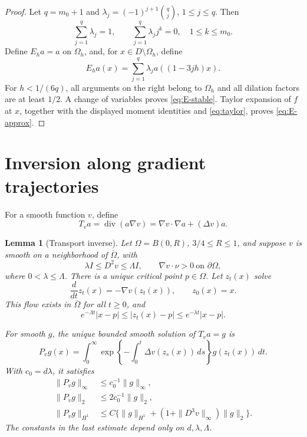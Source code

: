 \documentclass[11pt]{article}
\newtheorem{lemma}[theorem]{Lemma}
\theoremstyle{remark}
\DeclareMathOperator{\divergence}{div}
\begin{document}
\begin{proof}
Let \(q=m_0+1\) and
\(\lambda_j=(-1)^{j+1}\binom qj\), \(1\leq j\leq q\).
Then
\[
\sum_{j=1}^q\lambda_j=1,\qquad
\sum_{j=1}^q\lambda_j j^k=0,\quad 1\leq k\leq m_0.
\]
Define \(E_h a=a\) on \(\Omega_h\), and, for \(x\in D\setminus\Omega_h\),
define
\[
E_h a(x)=\sum_{j=1}^q\lambda_j a((1-3jh)x).
\]
For \(h<1/(6q)\), all arguments on the right belong to \(\Omega_h\)
and all dilation factors are at least \(1/2\).
A change of variables proves \eqref{eq:E-stable}.
Taylor expansion of \(f\) at \(x\), together with the displayed
moment identities and \eqref{eq:taylor}, proves
\eqref{eq:E-approx}.
\end{proof}

\section{Inversion along gradient trajectories}

For a smooth function \(v\), define
\[
T_v a=\divergence(a\nabla v)
=\nabla v\cdot\nabla a+(\Delta v)a.
\]

\begin{lemma}[Transport inverse]\label{lem:transport}
Let \(\Omega=B(0,R)\), \(3/4\leq R\leq1\), and suppose \(v\) is
smooth on a neighborhood of \(\overline\Omega\), with
\begin{equation}\label{eq:geometry}
\lambda I\leq D^2v\leq\Lambda I,\qquad
\nabla v\cdot\nu>0\ \text{on }\partial\Omega,
\end{equation}
where \(0<\lambda\leq\Lambda\).
There is a unique critical point \(p\in\Omega\).
Let \(z_t(x)\) solve
\[
\frac{d}{dt}z_t(x)=-\nabla v(z_t(x)),\qquad z_0(x)=x.
\]
This flow exists in \(\overline\Omega\) for all \(t\geq0\), and
\begin{equation}\label{eq:radial-flow}
e^{-\Lambda t}|x-p|
\leq |z_t(x)-p|
\leq e^{-\lambda t}|x-p|.
\end{equation}

For smooth \(g\), the unique bounded smooth solution of \(T_v a=g\)
is
\begin{equation}\label{eq:transport-inverse}
P_vg(x)=
\int_0^\infty
\exp\left\{-\int_0^t\Delta v(z_s(x))\,ds\right\}
g(z_t(x))\,dt.
\end{equation}
With \(c_0=d\lambda\), it satisfies
\begin{align}
\|P_vg\|_\infty&\leq c_0^{-1}\|g\|_\infty,\label{eq:P-infty}\\
\|P_vg\|_2&\leq 2c_0^{-1}\|g\|_2,\label{eq:P-L2}\\
\|P_vg\|_{H^1}
&\leq C\big\{\|g\|_{H^1}
 +(1+\|D^3v\|_\infty)\|g\|_2\big\}.
\label{eq:P-H1}
\end{align}
The constants in the last estimate depend only on \(d,\lambda,\Lambda\).
\end{lemma}
\end{document}
